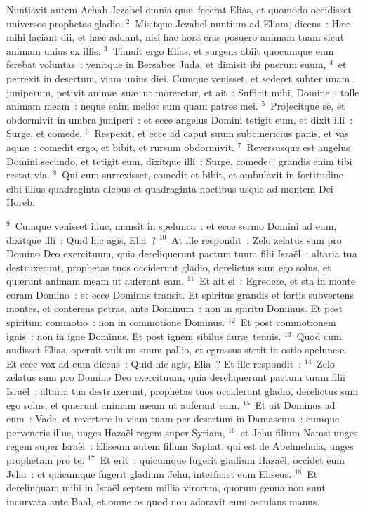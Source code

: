 \lettrine[lines=10,image=true,loversize=0.05,lraise=-0.03]{N}{}untiavit autem Achab Jezabel omnia qu\ae\ fecerat Elias, et quomodo occidisset universos prophetas gladio.
${}^{2}$~Misitque Jezabel nuntium ad Eliam, dicens~: H\ae c mihi faciant dii, et h\ae c addant, nisi hac hora cras posuero animam tuam sicut animam unius ex illis.
${}^{3}$~Timuit ergo Elias, et surgens abiit quocumque eum ferebat voluntas~: venitque in Bersabee Juda, et dimisit ibi puerum suum,
${}^{4}$~et perrexit in desertum, viam unius diei. Cumque venisset, et sederet subter unam juniperum, petivit anim\ae\ su\ae\ ut moreretur, et ait~: Sufficit mihi, Domine~: tolle animam meam~: neque enim melior sum quam patres mei.
${}^{5}$~Projecitque se, et obdormivit in umbra juniperi~: et ecce angelus Domini tetigit eum, et dixit illi~: Surge, et comede.
${}^{6}$~Respexit, et ecce ad caput suum subcinericius panis, et vas aqu\ae~: comedit ergo, et bibit, et rursum obdormivit.
${}^{7}$~Reversusque est angelus Domini secundo, et tetigit eum, dixitque illi~: Surge, comede~: grandis enim tibi restat via.
${}^{8}$~Qui cum surrexisset, comedit et bibit, et ambulavit in fortitudine cibi illius quadraginta diebus et quadraginta noctibus usque ad montem Dei Horeb.


${}^{9}$~Cumque venisset illuc, mansit in spelunca~: et ecce sermo Domini ad eum, dixitque illi~: Quid hic agis, Elia~?
${}^{10}$~At ille respondit~: Zelo zelatus sum pro Domino Deo exercituum, quia dereliquerunt pactum tuum filii Isra\"el~: altaria tua destruxerunt, prophetas tuos occiderunt gladio, derelictus sum ego solus, et qu\ae runt animam meam ut auferant eam.
${}^{11}$~Et ait ei~: Egredere, et sta in monte coram Domino~: et ecce Dominus transit. Et spiritus grandis et fortis subvertens montes, et conterens petras, ante Dominum~: non in spiritu Dominus. Et post spiritum commotio~: non in commotione Dominus.
${}^{12}$~Et post commotionem ignis~: non in igne Dominus. Et post ignem sibilus aur\ae\ tenuis.
${}^{13}$~Quod cum audisset Elias, operuit vultum suum pallio, et egressus stetit in ostio spelunc\ae . Et ecce vox ad eum dicens~: Quid hic agis, Elia~? Et ille respondit~:
${}^{14}$~Zelo zelatus sum pro Domino Deo exercituum, quia dereliquerunt pactum tuum filii Isra\"el~: altaria tua destruxerunt, prophetas tuos occiderunt gladio, derelictus sum ego solus, et qu\ae runt animam meam ut auferant eam.
${}^{15}$~Et ait Dominus ad eum~: Vade, et revertere in viam tuam per desertum in Damascum~: cumque perveneris illuc, unges Haza\"el regem super Syriam,
${}^{16}$~et Jehu filium Namsi unges regem super Isra\"el~: Eliseum autem filium Saphat, qui est de Abelmehula, unges prophetam pro te.
${}^{17}$~Et erit~: quicumque fugerit gladium Haza\"el, occidet eum Jehu~: et quicumque fugerit gladium Jehu, interficiet eum Eliseus.
${}^{18}$~Et derelinquam mihi in Isra\"el septem millia virorum, quorum genua non sunt incurvata ante Baal, et omne os quod non adoravit eum osculans manus.


